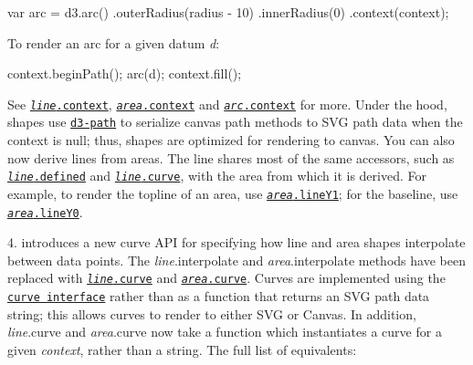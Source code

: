 \begin{DoxyCode}
var arc = d3.arc()
    .outerRadius(radius - 10)
    .innerRadius(0)
    .context(context);
\end{DoxyCode}


To render an arc for a given datum {\itshape d}\+:


\begin{DoxyCode}
context.beginPath();
arc(d);
context.fill();
\end{DoxyCode}


See \href{https://github.com/d3/d3-shape/blob/master/README.md#line_context}{\tt {\itshape line}.context}, \href{https://github.com/d3/d3-shape/blob/master/README.md#area_context}{\tt {\itshape area}.context} and \href{https://github.com/d3/d3-shape/blob/master/README.md#arc_context}{\tt {\itshape arc}.context} for more. Under the hood, shapes use \href{#paths-d3-path}{\tt d3-\/path} to serialize canvas path methods to S\+VG path data when the context is null; thus, shapes are optimized for rendering to canvas. You can also now derive lines from areas. The line shares most of the same accessors, such as \href{https://github.com/d3/d3-shape/blob/master/README.md#line_defined}{\tt {\itshape line}.defined} and \href{https://github.com/d3/d3-shape/blob/master/README.md#line_curve}{\tt {\itshape line}.curve}, with the area from which it is derived. For example, to render the topline of an area, use \href{https://github.com/d3/d3-shape/blob/master/README.md#area_lineY1}{\tt {\itshape area}.line\+Y1}; for the baseline, use \href{https://github.com/d3/d3-shape/blob/master/README.md#area_lineY0}{\tt {\itshape area}.line\+Y0}.

4. introduces a new curve A\+PI for specifying how line and area shapes interpolate between data points. The {\itshape line}.interpolate and {\itshape area}.interpolate methods have been replaced with \href{https://github.com/d3/d3-shape/blob/master/README.md#line_curve}{\tt {\itshape line}.curve} and \href{https://github.com/d3/d3-shape/blob/master/README.md#area_curve}{\tt {\itshape area}.curve}. Curves are implemented using the \href{https://github.com/d3/d3-shape/blob/master/README.md#custom-curves}{\tt curve interface} rather than as a function that returns an S\+VG path data string; this allows curves to render to either S\+VG or Canvas. In addition, {\itshape line}.curve and {\itshape area}.curve now take a function which instantiates a curve for a given {\itshape context}, rather than a string. The full list of equivalents\+:


